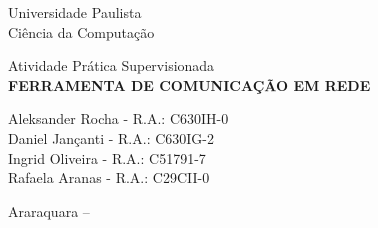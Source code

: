 \begin{center}
	\Huge Universidade Paulista\\
	\large Ciência da Computação
	
	\vfill
	
	\large Atividade Prática Supervisionada\\
	\textbf{\MakeUppercase{Ferramenta de comunicação em rede}}
	
	\bigskip
	\bigskip
	
	\normalsize{
		Aleksander Rocha - R.A.: C630IH-0\\
		Daniel Jançanti - R.A.: C630IG-2\\
		Ingrid Oliveira - R.A.: C51791-7\\
		Rafaela Aranas - R.A.: C29CII-0\\
	}
	
	\vfill
	
	Araraquara -- \the\year

\end{center}

\thispagestyle{empty}